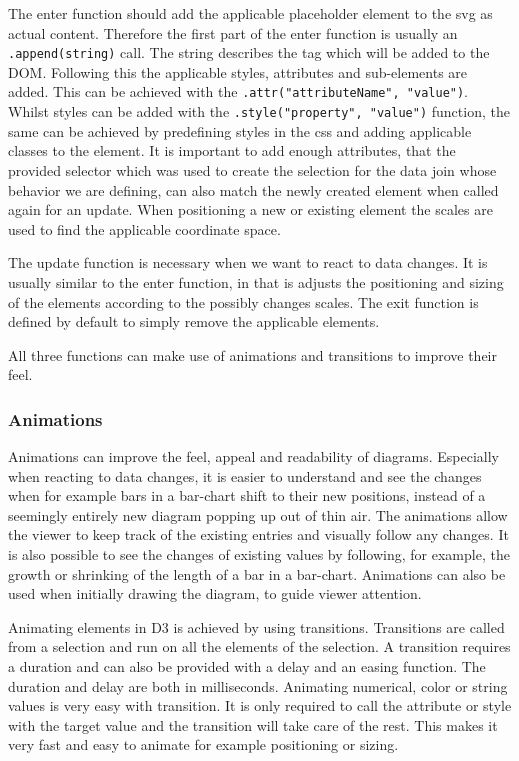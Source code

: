 The enter function should add the applicable placeholder element to the svg as actual content. Therefore the first part of the enter function is usually an \verb|.append(string)| call. The string describes the tag which will be added to the DOM. Following this the applicable styles, attributes and sub-elements are added. This can be achieved with the \verb|.attr("attributeName", "value")|. Whilst styles can be added with the \verb|.style("property", "value")| function, the same can be achieved by predefining styles in the css and adding applicable classes to the element. It is important to add enough attributes, that the provided selector which was used to create the selection for the data join whose behavior we are defining, can also match the newly created element when called again for an update. When positioning a new or existing element the  scales are used to find the applicable coordinate space.

The update function is necessary when we want to react to data changes. It is usually similar to the enter function, in that is adjusts the positioning and sizing of the elements according to the possibly changes scales. The exit function is defined by default to simply remove the applicable elements.

All three functions can make use of animations and transitions to improve their feel.

\subsubsection{Animations}

Animations can improve the feel, appeal and readability of diagrams. Especially when reacting to data changes, it is easier to understand and see the changes when for example bars in a bar-chart shift to their new positions, instead of a seemingly entirely new diagram popping up out of thin air. The animations allow the viewer to keep track of the existing entries and visually follow any changes. It is also possible to see the changes of existing values by following, for example, the growth or shrinking of the length of a bar in a bar-chart. Animations can also be used when initially drawing the diagram, to guide viewer attention.

Animating elements in D3 is achieved by using transitions. Transitions are called from a selection and run on all the elements of the selection. A transition requires a duration and can also be provided with a delay and an easing function. The duration and delay are both in milliseconds. Animating numerical, color or string values is very easy with transition. It is only required to call the attribute or style with the target value and the transition will take care of the rest. This makes it very fast and easy to animate for example positioning or sizing.


